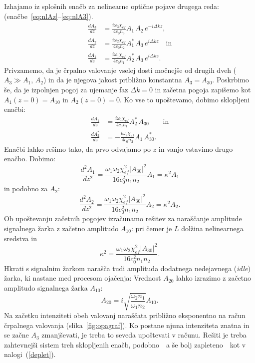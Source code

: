 Izhajamo iz splošnih enačb za nelinearne optične pojave drugega reda:
(enačbe~\ref{eq:nlAz}--\ref{eq:nlA3}). 
\begin{align}
\frac{dA_{3}}{dz} &=\frac{i\omega_{3}\chi_{ef}}{4c_0 n_3} A_{1}\, A_{2}\, e^{-i\Delta kz}, \\
\frac{dA_{2}}{dz} &=\frac{i\omega_{2}\chi_{ef}}{4c_0 n_2} A_{1}^*\, A_{3}\, e^{i\Delta kz}\quad \textrm{in}\\
\frac{dA_{1}}{dz} &=\frac{i\omega_{1}\chi_{ef}}{4c_0 n_1} A_{2}^*\, A_{3}\, e^{i\Delta kz}.
\label{eq:opaA}
\end{align}
Privzamemo, da je črpalno valovanje vselej dosti močnejše od drugih dveh
($A_{3}\gg A_{1}$, $A_{2}$) in da je njegova jakost približno konstantna $A_3 = A_{30}$.
Poskrbimo še, da je izpolnjen pogoj za ujemanje faz $\Delta k=0$ in
začetna pogoja zapišemo kot $A_{1}(z=0)=A_{10}$ in $A_{2}(z=0)=0$. Ko vse to upoštevamo,
dobimo sklopljeni enačbi:
\begin{align}
\frac{dA_{1}}{dz} &= \frac{i\omega_{1}\chi_{ef}}{4c_0 n_1} A_{2}^*\, A_{30}\label{eq:opaA1} 
\qquad \mathrm{in} \\
\frac{dA_{2}^*}{dz} &= -\frac{i\omega_{2}\chi_{ef}}{4c_0 n_2} A_{1}\, A_{30}^*.
\label{eq:opaA2}
\end{align}
Enačbi lahko rešimo tako, da prvo odvajamo po $z$ in vanjo vstavimo drugo enačbo.
Dobimo:
\begin{equation}
\frac{d^2 A_1}{d z^2} = \frac{\omega_1 \omega_2 \chi_{ef}^2|A_{30}|^2}
{16 c_0^2 n_1 n_2} A_1 = \kappa^2 A_1
\end{equation}
in podobno za $A_2$:
\begin{equation}
\frac{d^2 A_2}{d z^2} = \frac{\omega_1 \omega_2 \chi_{ef}^2|A_{30}|^2}
{16 c_0^2 n_1 n_2} A_2 = \kappa^2 A_2.
\end{equation}
Ob upoštevanju začetnih pogojev izračunamo rešitev za naraščanje amplitude signalnega žarka
z začetno amplitudo $A_{10}$:
pri čemer je $L$ dolžina nelinearnega sredstva in 
\begin{equation}
\kappa^2 = \frac{\omega_1 \omega_2 \chi_{ef}^2|A_{30}|^2}
{16 c_0^2 n_1 n_2}.
\label{opakapa}
\end{equation}
Hkrati s signalnim žarkom narašča tudi amplituda dodatnega nedejavnega 
({\it idle}) žarka, ki nastane med procesom ojačenja:
Vrednost $A_{20}$ lahko izrazimo z začetno amplitudo signalnega žarka $A_{10}$:
\begin{equation}
A_{20} = i \sqrt{\frac{\omega_2 n_1}{\omega_1 n_2}} A_{10}.
\label{opakapaA}
\end{equation}
Na začetku intenziteti obeh valovanj naraščata približno eksponentno na račun črpalnega
valovanja (slika~\ref{fig:opagraf}). Ko postane njuna intenziteta znatna in se 
začne $A_3$ zmanjševati, je treba to seveda
upoštevati v računu. Rešiti je treba zahtevnejši sistem treh 
sklopljenih enačb, podobno~\textendash~a še bolj zapleteno~\textendash~kot v nalogi~(\ref{deplet}).

